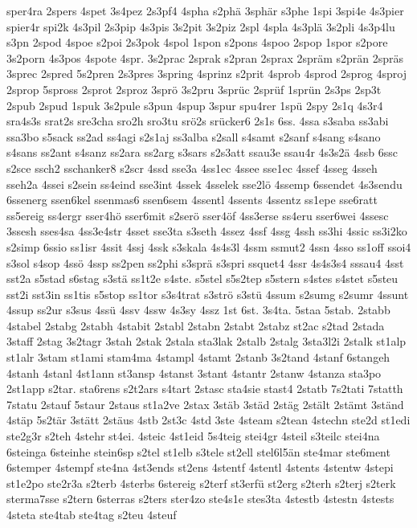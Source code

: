 {sper4ra
2spers
4spet
3s4pez
2s3pf4
4spha
s2phä
3sphär
s3phe
1spi
3spi4e
4s3pier
spier4r
spi2k
4s3pil
2s3pip
4s3pis
3s2pit
3s2piz
2spl
4spla
4s3plä
3s2pli
4s3p4lu
s3pn
2spod
4spoe
s2poi
2s3pok
4spol
1spon
s2pons
4spoo
2spop
1spor
s2pore
3s2porn
4s3pos
4spote
4spr.
3s2prac
2sprak
s2pran
2sprax
2spräm
s2prän
2spräs
3sprec
2spred
5s2pren
2s3pres
3spring
4sprinz
s2prit
4sprob
4sprod
2sprog
4sproj
2sprop
5spross
2sprot
2sproz
3sprö
3s2pru
3sprüc
2sprüf
1sprün
2s3ps
2sp3t
2spub
2spud
1spuk
3s2pule
s3pun
4spup
3spur
spu4rer
1spü
2spy
2s1q
4s3r4
sra4s3s
srat2s
sre3cha
sro2h
sro3tu
srö2s
srücker6
2s1s
6ss.
4ssa
s3saba
ss3abi
ssa3bo
s5sack
ss2ad
ss4agi
s2s1aj
ss3alba
s2sall
s4samt
s2sanf
s4sang
s4sano
s4sans
ss2ant
s4sanz
ss2ara
ss2arg
s3sars
s2s3att
ssau3e
ssau4r
4s3s2ä
4ssb
6ssc
s2sce
ssch2
sschanker8
s2scr
4ssd
sse3a
4ss1ec
4ssee
sse1ec
4ssef
4sseg
4sseh
sseh2a
4ssei
s2sein
ss4eind
sse3int
4ssek
4sselek
sse2lö
4ssemp
6ssendet
4s3sendu
6ssenerg
ssen6kel
ssenmas6
ssen6sem
4ssentl
4ssents
4ssentz
ss1epe
sse6ratt
ss5ereig
ss4ergr
sser4hö
sser6mit
s2serö
sser4öf
4ss3erse
ss4eru
sser6wei
4ssesc
3ssesh
sses4sa
4ss3e4str
4sset
sse3ta
s3seth
4ssez
4ssf
4ssg
4ssh
ss3hi
4ssic
ss3i2ko
s2simp
6ssio
ss1isr
4ssit
4ssj
4ssk
s3skala
4s4s3l
4ssm
ssmut2
4ssn
4sso
ss1off
ssoi4
s3sol
s4sop
4ssö
4ssp
ss2pen
ss2phi
s3sprä
s3spri
ssquet4
4ssr
4s4s3s4
sssau4
4sst
sst2a
s5stad
s6stag
s3stä
ss1t2e
s4ste.
s5stel
s5s2tep
s5stern
s4stes
s4stet
s5steu
sst2i
sst3in
ss1tis
s5stop
ss1tor
s3s4trat
s3strö
s3stü
4ssum
s2sumg
s2sumr
4ssunt
4ssup
ss2ur
s3sus
4ssü
4ssv
4ssw
4s3sy
4ssz
1st
6st.
3s4ta.
5staa
5stab.
2stabb
4stabel
2stabg
2stabh
4stabit
2stabl
2stabn
2stabt
2stabz
st2ac
s2tad
2stada
3staff
2stag
3s2tagr
3stah
2stak
2stala
sta3lak
2stalb
2stalg
3sta3l2i
2stalk
st1alp
st1alr
3stam
st1ami
stam4ma
4stampl
4stamt
2stanb
3s2tand
4stanf
6stangeh
4stanh
4stanl
4st1ann
st3ansp
4stanst
3stant
4stantr
2stanw
4stanza
sta3po
2st1app
s2tar.
sta6rens
s2t2ars
s4tart
2stasc
sta4sie
stast4
2statb
7s2tati
7statth
7statu
2stauf
5staur
2staus
st1a2ve
2stax
3stäb
3städ
2stäg
2stält
2stämt
3ständ
4stäp
5s2tär
3stätt
2stäus
4stb
2st3c
4std
3ste
4steam
s2tean
4stechn
ste2d
st1edi
ste2g3r
s2teh
4stehr
st4ei.
4steic
4st1eid
5s4teig
stei4gr
4steil
s3teilc
stei4na
6steinga
6steinhe
stein6sp
s2tel
st1elb
s3tele
st2ell
stel6l5än
ste4mar
ste6ment
6stemper
4stempf
ste4na
4st3ends
st2ens
4stentf
4stentl
4stents
4stentw
4stepi
st1e2po
ste2r3a
s2terb
4sterbs
6stereig
s2terf
st3erfü
st2erg
s2terh
s2terj
s2terk
sterma7sse
s2tern
6sterras
s2ters
ster4zo
ste4s1e
stes3ta
4stestb
4stestn
4stests
4steta
ste4tab
ste4tag
s2teu
4steuf
}
